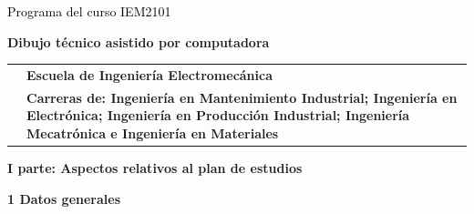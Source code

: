 \documentclass[letterpaper]{article}%
\begin{document}
%
\normalsize%
\thispagestyle{empty}%
%
\vspace*{150mm}%
\par\fontsize{14}{0}\selectfont \textcolor{black}{Programa del curso IEM2101}%
\par\fontsize{18}{25}\selectfont \textbf{\textcolor{azulsuaveTEC}{Dibujo técnico asistido por computadora}}%
\begin{tabularx}{\textwidth}{m{}m{}}%
&\hspace*{0mm}\fontsize{12}{14}\selectfont \textbf{\textcolor{gris}{Escuela de Ingeniería Electromecánica}}\\%
[-4pt]%
&\hspace*{0mm}\fontsize{12}{14}\selectfont \textbf{\textcolor{gris}{Carreras de: Ingeniería en Mantenimiento Industrial; Ingeniería en Electrónica; Ingeniería en Producción Industrial; Ingeniería Mecatrónica e Ingeniería en Materiales}}\\%
\end{tabularx}%
\newpage%
\pagestyle{headfoot}%
\par\fontsize{14}{0}\selectfont \textbf{\textcolor{parte}{I parte: Aspectos relativos al plan de estudios}}%
\par\hspace*{4mm}\fontsize{12}{20}\selectfont \textbf{\textcolor{parte}{1 Datos generales}}%
\end{document}
